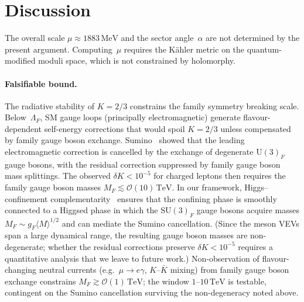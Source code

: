\documentclass[preprint,12pt]{elsarticle}
\newcommand{\SU}{\mathrm{SU}}
\newcommand{\UU}{\mathrm{U}}
\newcommand{\MeV}{\,\mathrm{MeV}}
\newcommand{\TeV}{\,\mathrm{TeV}}
\begin{document}
\section{Discussion}
The overall scale
$\mu \approx 1883\MeV$ and the sector angle~$\alpha$
are not determined by the present argument.
Computing~$\mu$ requires the K\"ahler metric on the
quantum-modified moduli space, which is not constrained
by holomorphy.

\paragraph{Falsifiable bound.}
The radiative stability of $K = 2/3$ constrains the
family symmetry breaking scale.
Below~$\Lambda_F$, SM gauge loops (principally
electromagnetic) generate flavour-dependent
self-energy corrections that would spoil
$K = 2/3$ unless compensated by family gauge
boson exchange.
Sumino~\cite{Sumino:2009} showed that the leading
electromagnetic correction is cancelled by the
exchange of degenerate $\UU(3)_F$ gauge bosons,
with the residual correction suppressed by
family gauge boson mass splittings.
The observed $\delta K < 10^{-5}$ for charged leptons
then requires the family gauge boson masses
$M_F \lesssim \mathcal{O}(10)\TeV$.
In our framework, Higgs--confinement
complementarity~\cite{Csaki:1996zb}
ensures that the confining phase is smoothly
connected to a Higgsed phase in which the
$\SU(3)_F$ gauge bosons acquire masses
$M_F \sim g_F \langle M \rangle^{1/2}$
and can mediate the Sumino cancellation.
(Since the meson VEVs span a large dynamical
range, the resulting gauge boson masses are
non-degenerate; whether the residual corrections
preserve $\delta K < 10^{-5}$ requires a
quantitative analysis that we leave to future work.)
Non-observation of flavour-changing neutral currents
(e.g.\ $\mu \to e\gamma$, $K$--$\bar{K}$ mixing)
from family gauge boson exchange constrains
$M_F \gtrsim \mathcal{O}(1)\TeV$;
the window $1$--$10\TeV$ is testable,
contingent on the Sumino cancellation surviving
the non-degeneracy noted above.
\end{document}
